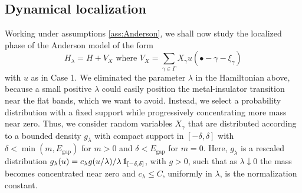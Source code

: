 \documentclass[reqno,12pt,letterpaper]{amsart}
\numberwithin{equation}{section}
\def\indic{\operatorname{1\hskip-2.75pt\relax l}}
\begin{document}
\subsection{Dynamical localization}
Working under assumptions \eqref{ass:Anderson}, we shall now study the localized phase of the Anderson model of the form
\begin{equation}
\label{eq:Anderson2}
 H_{\lambda} = H + V_X \text{ where } V_X = \sum_{\gamma \in \Gamma}X_{\gamma} u(\bullet-\gamma-\xi_{\gamma})
\end{equation}
{with $u$ as in Case 1. We eliminated the parameter $\lambda$ in the Hamiltonian above, because a small positive $\lambda$ could easily position the metal-insulator transition near the flat bands, which we want to avoid. Instead, we select a probability distribution with a fixed support while progressively concentrating more mass near zero. }Thus, we consider random variables $X_{\gamma}$ that are distributed according to a bounded density $g_{\lambda}$ with compact support in $[-\delta,\delta]$ with $\delta<\min(m,E_{\operatorname{gap}})$ for $m> 0$ and $\delta<E_{\operatorname{gap}}$ for $m=0$.
Here, $g_{\lambda}$ is a rescaled distribution $g_{\lambda}(u) = c_{\lambda} g(u/\lambda)/\lambda \indic_{[-\delta,\delta]}$, with $g>0$,  such that as $\lambda \downarrow 0$ the mass becomes concentrated near zero and $c_{\lambda}\le C$, uniformly in $\lambda$, is the normalization constant. 
\end{document}
